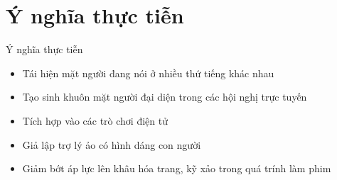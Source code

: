 \section{Ý nghĩa thực tiễn}\label{sec:intro}
\frame{\tableofcontents[currentsection]}
\begin{frame}{Ý nghĩa thực tiễn}
\begin{itemize}
    \item Tái hiện mặt người đang nói ở nhiều thứ tiếng khác nhau
    \item Tạo sinh khuôn mặt người đại diện trong các hội nghị trực tuyến
    \item Tích hợp vào các trò chơi điện tử
    \item Giả lập trợ lý ảo có hình dáng con người
    \item Giảm bớt áp lực lên khâu hóa trang, kỹ xảo trong quá trính làm phim
\end{itemize}
\end{frame}
